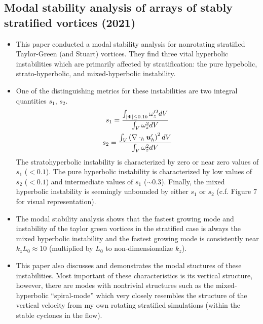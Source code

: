 \documentclass{article}
\begin{document}
    \subsection{Modal stability analysis of arrays of stably stratified vortices
    (2021)}
    \begin{itemize}
        \item This paper conducted a modal stability analysis for nonrotating
        stratified Taylor-Green (and Stuart) vortices. They find three vital
        hyperbolic instabilities which are primarily affected by stratification:
        the pure hypebolic, strato-hyperbolic, and mixed-hyperbolic instability. 
        \item One of the distinguishing metrics for these instabilities are
        two integral quantities $s_1$, $s_2$. 
        \begin{gather*}
            s_1 = \frac{\int_{|\Phi| \le 0.1b} \omega_z'^2dV}{\int_V \omega_z^2
            dV}\\
            s_2 = \frac{\int_V \left(\nabla \cdot_h\boldsymbol{u}_h'\right)^2dV}{\int_V \omega_z^2
            dV}\\
        \end{gather*}
        The stratohyperbolic instability is characterized by zero or near zero
        values of $s_1$ ($< 0.1$). The pure hyperbolic instability is characterized by low
        values of $s_2$ ($< 0.1$) and intermediate values of $s_1$ ($\sim 0.3$).
        Finally, the mixed hyperbolic instability is seemingly unbounded by
        either $s_1$ or $s_2$ (c.f. Figure 7 for visual representation). 
        \item The modal stability analysis shows that the fastest growing mode
        and instability of the taylor green vortices in the stratified case is
        always the mixed hyperbolic instability and the fastest growing mode is
        consistently near $k_zL_0 \approx 10$ (multiplied by $L_0$ to
        non-dimensionalize $k_z$). 
        \item This paper also discusses and demonstrates the modal stuctures of
        these instabilities. Most important of these characteristics is its
        vertical structure, however, there are modes with nontrivial structures
        such as the mixed-hyperbolic ``spiral-mode'' which very closely
        resembles the structure of the vertical velocity from my own rotating
        stratified simulations (within the stable cyclones in the flow). 
    \end{itemize}
\end{document}
